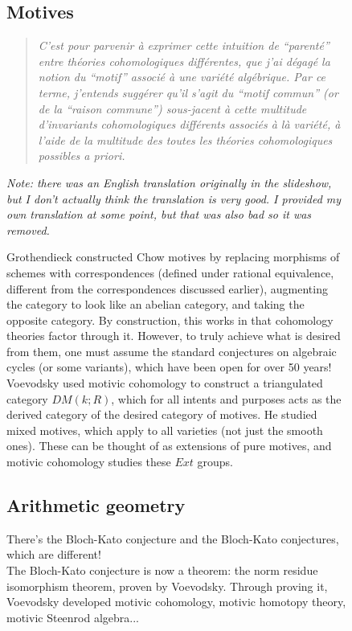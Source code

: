 \documentclass[leqno, openany]{memoir}
\theoremstyle{definition}
\theoremstyle{remark}
\theoremstyle{plain}
\theoremstyle{definition}
\theoremstyle{remark}
\begin{document}
\begin{figure}[htpb]
    \subsection{Motives} \begin{quotation} \textit{C'est pour parvenir \`a
        exprimer cette intuition de ``parent\'e'' entre th\'eories
    cohomologiques diff\'erentes, que j'ai d\'egag\'e la notion du ``motif''
associ\'e \`a une vari\'et\'e alg\'ebrique. Par ce terme, j'entends sugg\'erer
qu'il s'agit du ``motif commun'' (or de la ``raison commune'') sous-jacent \`a
cette multitude d'invariants cohomologiques diff\'erents associ\'es \`a l\`a
vari\'et\'e, \`a l'aide de la multitude des toutes les th\'eories
cohomologiques possibles a priori.}
\end{quotation} \textit{Note: there was an English translation originally in
the slideshow, but I don't actually think the translation is very good. I
provided my own translation at some point, but that was also bad so it was
removed.} 

Grothendieck constructed Chow motives by replacing morphisms of schemes with
correspondences (defined under rational equivalence, different from the
correspondences discussed earlier), augmenting the category to look like an
abelian category, and taking the opposite category.  By construction, this
works in that cohomology theories factor through it.  However, to truly achieve
what is desired from them, one must assume the standard conjectures on
algebraic cycles (or some variants), which have been open for over 50 years! \\ 

Voevodsky used motivic cohomology to construct a triangulated category $DM(k;
R)$, which for all intents and purposes acts as the derived category of the
desired category of motives.  He studied mixed motives, which apply to all
varieties (not just the smooth ones).  These can be thought of as extensions of
pure motives, and motivic cohomology studies these $Ext$ groups.  

\subsection{Arithmetic geometry} There's the Bloch-Kato conjecture and the
Bloch-Kato conjectures, which are different! \\ 

The Bloch-Kato conjecture is now a theorem: the norm residue isomorphism
theorem, proven by Voevodsky.  Through proving it, Voevodsky developed motivic
cohomology, motivic homotopy theory, motivic Steenrod algebra... \\


\end{figure}
\end{document}
